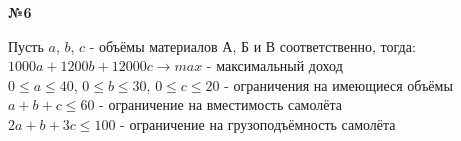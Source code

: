 \documentclass{article}
\newenvironment{task}{\begin{center}\fontsize{14}{14}\selectfont\bf}{\rm\fontsize{12}{12}\selectfont\end{center}}
\begin{document}
	
	\begin{task} 
		№6
	\end{task}
	Пусть $a$, $b$, $c$ - объёмы материалов А, Б и В соответственно, тогда: \\
	\hspace{10px}	$1000a + 1200b + 12000c \rightarrow max$ \quad - максимальный доход \\
	\hspace{10px}	$0 \leq a \leq 40$, $0 \leq b \leq 30$, $0 \leq c \leq 20$ \quad - ограничения на имеющиеся объёмы \\
	\hspace{10px}	$a+b+c \leq 60$ \quad - ограничение на вместимость самолёта \\
	\hspace{10px}	$2a+b+3c \leq 100$ \quad - ограничение на грузоподъёмность самолёта 
\end{document}
